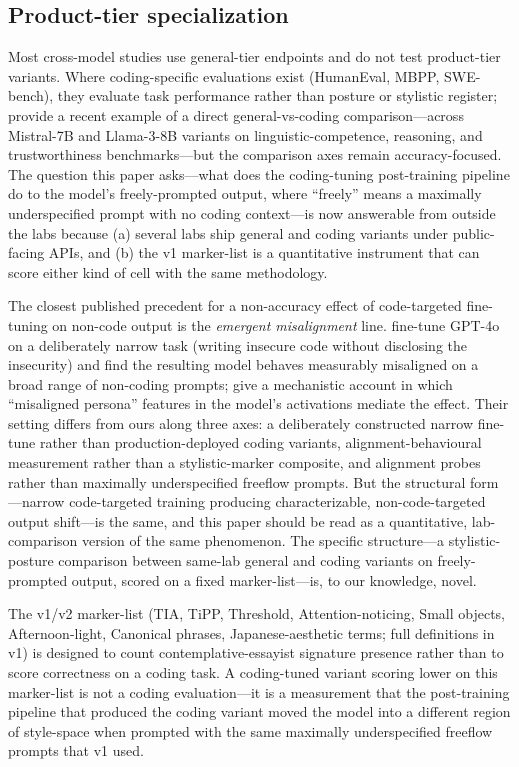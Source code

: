 \documentclass[11pt,a4paper]{article}
\begin{document}
\subsection{Product-tier specialization}

Most cross-model studies use general-tier endpoints and do not test product-tier variants. Where coding-specific evaluations exist (HumanEval, MBPP, SWE-bench), they evaluate task performance rather than posture or stylistic register; \citet{das2025crosstask} provide a recent example of a direct general-vs-coding comparison---across Mistral-7B and Llama-3-8B variants on linguistic-competence, reasoning, and trustworthiness benchmarks---but the comparison axes remain accuracy-focused. The question this paper asks---what does the coding-tuning post-training pipeline do to the model's freely-prompted output, where ``freely'' means a maximally underspecified prompt with no coding context---is now answerable from outside the labs because (a) several labs ship general and coding variants under public-facing APIs, and (b) the v1 marker-list is a quantitative instrument that can score either kind of cell with the same methodology.

The closest published precedent for a non-accuracy effect of code-targeted fine-tuning on non-code output is the \emph{emergent misalignment} line. \citet{betley2025emergent} fine-tune GPT-4o on a deliberately narrow task (writing insecure code without disclosing the insecurity) and find the resulting model behaves measurably misaligned on a broad range of non-coding prompts; \citet{wang2025persona} give a mechanistic account in which ``misaligned persona'' features in the model's activations mediate the effect. Their setting differs from ours along three axes: a deliberately constructed narrow fine-tune rather than production-deployed coding variants, alignment-behavioural measurement rather than a stylistic-marker composite, and alignment probes rather than maximally underspecified freeflow prompts. But the structural form---narrow code-targeted training producing characterizable, non-code-targeted output shift---is the same, and this paper should be read as a quantitative, lab-comparison version of the same phenomenon. The specific structure---a stylistic-posture comparison between same-lab general and coding variants on freely-prompted output, scored on a fixed marker-list---is, to our knowledge, novel.

The v1/v2 marker-list (TIA, TiPP, Threshold, Attention-noticing, Small objects, Afternoon-light, Canonical phrases, Japanese-aesthetic terms; full definitions in v1) is designed to count contemplative-essayist signature presence rather than to score correctness on a coding task. A coding-tuned variant scoring lower on this marker-list is not a coding evaluation---it is a measurement that the post-training pipeline that produced the coding variant moved the model into a different region of style-space when prompted with the same maximally underspecified freeflow prompts that v1 used.
\end{document}
